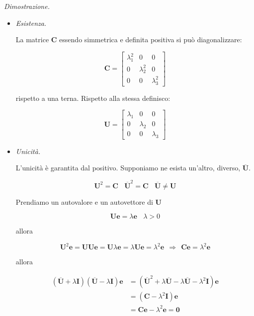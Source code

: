 \documentclass[10pt,a4paper,twoside]{book}
\begin{document}
\textit{Dimostrazione.}
\begin{itemize}
\item \textit{Esistenza.}

La matrice $\mathbf{C}$ essendo simmetrica e definita positiva si può diagonalizzare:

\begin{equation*}
\mathbf{C} =\begin{bmatrix}
\lambda ^{2}_{1} & 0 & 0\\
0 & \lambda ^{2}_{2} & 0\\
0 & 0 & \lambda ^{2}_{3}
\end{bmatrix}
\end{equation*}

rispetto a una terna. Rispetto alla stessa definisco:

\begin{equation*}
\mathbf{U} =\begin{bmatrix}
\lambda _{1} & 0 & 0\\
0 & \lambda _{2} & 0\\
0 & 0 & \lambda _{3}
\end{bmatrix}
\end{equation*}
\item \textit{Unicità.}

L'unicità è garantita dal positivo. Supponiamo ne esista un'altro, diverso, $\overline{\mathbf{U}}$.

\begin{equation*}
\mathbf{U}^{2} =\mathbf{C} \ \ \ \ \overline{\mathbf{U}}^{2} =\mathbf{C} \ \ \ \ \overline{\mathbf{U}} \neq \mathbf{U}
\end{equation*}

Prendiamo un autovalore e un autovettore di $\mathbf{U}$

\begin{equation*}
\mathbf{Ue} =\lambda \mathbf{e} \ \ \ \ \lambda  >0
\end{equation*}

allora

\begin{equation*}
\mathbf{U}^{2}\mathbf{e} =\mathbf{UUe} =\mathbf{U} \lambda \mathbf{e} =\lambda \mathbf{Ue} =\lambda ^{2}\mathbf{e} \ \ \Rightarrow \ \ \mathbf{Ce} =\lambda ^{2}\mathbf{e}
\end{equation*}

allora

\begin{equation*}
\begin{aligned}
(\overline{\mathbf{U}} +\lambda \mathbf{I})(\overline{\mathbf{U}} -\lambda \mathbf{I})\mathbf{e} & =\left(\overline{\mathbf{U}}^{2} +\lambda \overline{\mathbf{U}} -\lambda \overline{\mathbf{U}} -\lambda ^{2}\mathbf{I}\right)\mathbf{e}\\
 & =\left(\mathbf{C} -\lambda ^{2}\mathbf{I}\right)\mathbf{e}\\
 & =\mathbf{Ce} -\lambda ^{2}\mathbf{e} =\mathbf{0}
\end{aligned}
\end{equation*}


\end{itemize}
\end{document}
